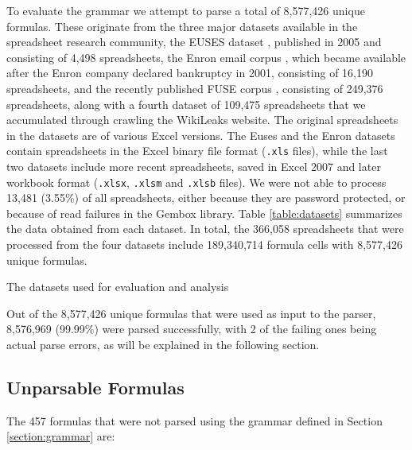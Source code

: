 \documentclass[times]{smrauth}
\begin{document}
To evaluate the grammar we attempt to parse a total of 8,577,426 unique formulas. These originate from the three major datasets available in the spreadsheet research community, the EUSES dataset \cite{euses}, published in 2005 and consisting of 4,498 spreadsheets, the Enron email corpus \cite{enron}, which became available after the Enron company declared bankruptcy in 2001, consisting of 16,190 spreadsheets, and the recently published FUSE corpus \cite{fuse}, consisting of 249,376 spreadsheets, along with a fourth dataset of 109,475 spreadsheets that we accumulated through crawling the WikiLeaks website. The original spreadsheets in the datasets are of various Excel versions. The Euses and the Enron datasets contain spreadsheets in the Excel binary file format (\texttt{.xls} files), while the last two datasets include more recent spreadsheets, saved in Excel 2007 and later workbook format (\texttt{.xlsx}, \texttt{.xlsm} and \texttt{.xlsb} files). We were not able to process 13,481 (3.55\%) of all spreadsheets, either because they are password protected, or because of read failures in the Gembox library. Table \ref{table:datasets} summarizes the data obtained from each dataset. In total, the 366,058 spreadsheets that were processed from the four datasets include 189,340,714 formula cells with 8,577,426 unique formulas.

\begin{table}[]
	\centering
	\caption{The datasets used for evaluation and analysis}
	\label{table:datasets}
	
\end{table}

Out of the 8,577,426 unique formulas that were used as input to the parser, 8,576,969 (99.99\%) were parsed successfully, with 2 of the failing ones being actual parse errors, as will be explained in the following section.

\subsection{Unparsable Formulas}
\label{subsection:unparsableFormulas}
The 457 formulas that were not parsed using the grammar defined in Section \ref{section:grammar} are:
\end{document}
